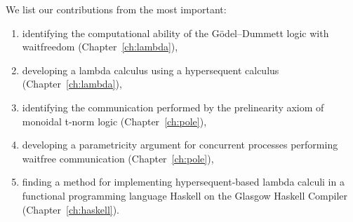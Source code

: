 We list our contributions from the most important:
\begin{enumerate}
 \item identifying the computational ability of the
G\"odel--Dummett logic with waitfreedom (Chapter~\ref{ch:lambda}),
 \item developing a lambda calculus using
       a hypersequent calculus (Chapter~\ref{ch:lambda}),
 \item identifying the communication performed by the prelinearity axiom
       of monoidal t-norm logic (Chapter~\ref{ch:pole}),
 \item developing a parametricity argument for
       concurrent processes performing waitfree communication (Chapter~\ref{ch:pole}),
 \item finding a method for implementing hypersequent-based lambda calculi in a
       functional programming language Haskell on the Glasgow Haskell
       Compiler (Chapter~\ref{ch:haskell}).
\end{enumerate}

